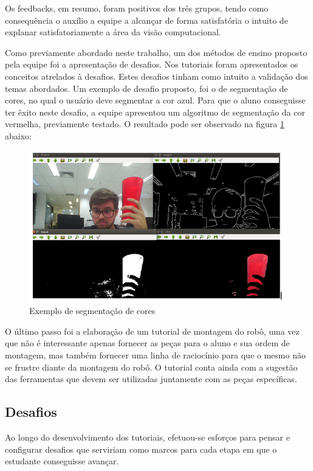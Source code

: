 Os feedbacks, em resumo, foram positivos dos três grupos, tendo como consequência o auxílio a equipe a alcançar de forma satisfatória o intuito de explanar satisfatoriamente a área da visão computacional.

Como previamente abordado neste trabalho, um dos métodos de ensino proposto pela equipe foi a apresentação de desafios. Nos tutoriais foram apresentados os conceitos atrelados à desafios. Estes desafios tinham como intuito a validação dos temas abordados. Um exemplo de desafio proposto, foi o de segmentação de cores, no qual o usuário deve segmentar a cor azul. Para que o aluno conseguisse ter êxito neste desafio, a equipe apresentou  um algoritmo de segmentação da cor vermelha, previamente testado. O resultado pode ser observado na figura \ref{fig:vermelho} abaixo:

\begin{figure}[H]
	\centering
	\includegraphics[scale=0.75, angle=0]{Figures/vermelho.png}
	\caption{Exemplo de segmentação de cores}
	\label{fig:vermelho}
\end{figure}

O último passo foi a elaboração de um tutorial de montagem do robô, uma vez que não é interessante apenas fornecer as peças para o aluno e sua ordem de montagem, mas também fornecer uma linha de raciocínio para que o mesmo não se frustre diante da montagem do robô. O tutorial conta ainda com a sugestão das ferramentas que devem ser utilizadas juntamente com as peças específicas.

\subsection{Desafios}
Ao longo do desenvolvimento dos tutoriais, efetuou-se esforços para pensar e configurar desafios que serviriam como marcos para cada etapa em que o estudante conseguisse avançar. 

